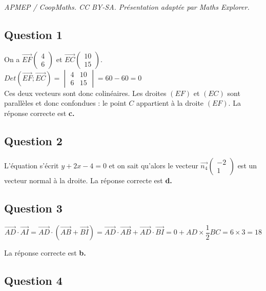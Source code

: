 \documentclass[10pt]{article}
\begin{document}
\noindent\textit{APMEP / CoopMaths. CC BY-SA. Présentation adaptée par Maths Explorer.}\par\medskip
\subsection*{Question 1}
	

On a $\overrightarrow{EF} \left( \begin{array}{c} 4 \\ 6 \end{array} \right)$ et $\overrightarrow{EC} \left( \begin{array}{c} 10 \\ 15 \end{array} \right)$.\\
$Det\left(\overrightarrow{EF};\overrightarrow{EC}\right) =\begin{vmatrix} 4&10\\6&15\end{vmatrix}=60-60=0$\\
Ces deux vecteurs sont donc colinéaires. Les droites $(EF)$ et $(EC)$ sont parallèles et donc confondues : le point $C$ appartient à la droite $(EF)$. La réponse correcte est \textbf{c.}
	
	\subsection*{Question 2}
	
L'équation s'écrit $y + 2x - 4 = 0$ et on sait qu'alors le vecteur $\overrightarrow{n_4} \left( \begin{array}{c} -2 \\ 1 \end{array} \right)$ est un vecteur normal à la droite. La réponse correcte est \textbf{d.}
	
	\subsection*{Question 3}
	
\[
	\overrightarrow{AD} \cdot \overrightarrow{AI} = \overrightarrow{AD} \cdot (\overrightarrow{AB} + \overrightarrow{BI}) = \overrightarrow{AD} \cdot \overrightarrow{AB} + \overrightarrow{AD} \cdot \overrightarrow{BI} = 0 + AD \times \dfrac{1}{2} BC = 6 \times 3 = 18
	\]
	
La réponse correcte est \textbf{b.}
	
	\subsection*{Question 4}
	
\end{document}
